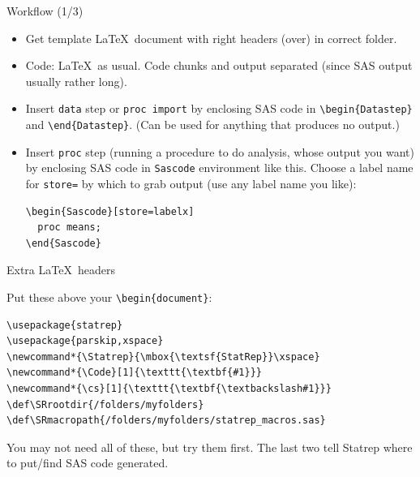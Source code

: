 \documentclass[unknownkeysallowed]{beamer}\usepackage[]{graphicx}\usepackage[]{color}
\newcommand*{\Statrep}{\mbox{\textsf{StatRep}}\xspace}
\newcommand*{\Code}[1]{\texttt{\textbf{#1}}}
\newcommand*{\cs}[1]{\texttt{\textbf{\textbackslash#1}}}
\def\SRrootdir{.}
\def\SRmacropath{./statrep_macros.sas}
\begin{document}
\begin{frame}[fragile]{Workflow (1/3)}
  \begin{itemize}
  \item Get template \LaTeX\ document with right headers (over) in
    correct folder.
  \item Code: \LaTeX\ as usual. Code chunks and output separated (since SAS
    output usually rather long). 
  \item Insert \texttt{data} step or \texttt{proc import} by enclosing SAS code
    in \verb+\begin{Datastep}+ and \verb+\end{Datastep}+. (Can be used
    for anything that produces no output.)
  \item Insert \texttt{proc} step (running a procedure to do analysis,
    whose output you want) by enclosing SAS code in \texttt{Sascode}
    environment like this. Choose a label name for \texttt{store=} by
    which to grab output (use any label name you like):
    
\begin{verbatim}
\begin{Sascode}[store=labelx]
  proc means;
\end{Sascode}
\end{verbatim}
    
    
  \end{itemize}
\end{frame}

\begin{frame}[fragile]{Extra \LaTeX\ headers}
  
  Put these above your \verb+\begin{document}+:
    
\begin{verbatim}
\usepackage{statrep}
\usepackage{parskip,xspace}
\newcommand*{\Statrep}{\mbox{\textsf{StatRep}}\xspace}
\newcommand*{\Code}[1]{\texttt{\textbf{#1}}}
\newcommand*{\cs}[1]{\texttt{\textbf{\textbackslash#1}}}
\def\SRrootdir{/folders/myfolders}
\def\SRmacropath{/folders/myfolders/statrep_macros.sas}
\end{verbatim}

You may not need all of these, but try them first. The last two tell
Statrep where to put/find SAS code generated.
  
\end{frame}
\end{document}
